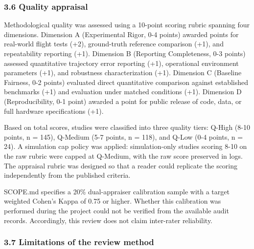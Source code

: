 \documentclass[conference]{IEEEtran}
\begin{document}
\subsubsection{3.6 Quality appraisal}


Methodological quality was assessed using a 10-point scoring rubric spanning four dimensions. Dimension A (Experimental Rigor, 0-4 points) awarded points for real-world flight tests (+2), ground-truth reference comparison (+1), and repeatability reporting (+1). Dimension B (Reporting Completeness, 0-3 points) assessed quantitative trajectory error reporting (+1), operational environment parameters (+1), and robustness characterization (+1). Dimension C (Baseline Fairness, 0-2 points) evaluated direct quantitative comparison against established benchmarks (+1) and evaluation under matched conditions (+1). Dimension D (Reproducibility, 0-1 point) awarded a point for public release of code, data, or full hardware specifications (+1).


Based on total scores, studies were classified into three quality tiers: Q-High (8-10 points, n = 145), Q-Medium (5-7 points, n = 118), and Q-Low (0-4 points, n = 24). A simulation cap policy was applied: simulation-only studies scoring 8-10 on the raw rubric were capped at Q-Medium, with the raw score preserved in logs. The appraisal rubric was designed so that a reader could replicate the scoring independently from the published criteria.


SCOPE.md specifies a 20\% dual-appraiser calibration sample with a target weighted Cohen's Kappa of 0.75 or higher. Whether this calibration was performed during the project could not be verified from the available audit records. Accordingly, this review does not claim inter-rater reliability.


\subsubsection{3.7 Limitations of the review method}
\end{document}
